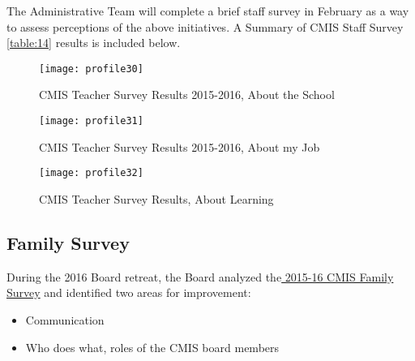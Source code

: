 The Administrative Team will complete a brief staff survey in February as a way to assess perceptions of the above initiatives.  A Summary of CMIS Staff Survey \ref{table:14} results is included below.   


\begin{figure}
\centering
\texttt{[image: profile30]}
\caption{CMIS Teacher Survey Results 2015-2016, About the School}
\end{figure}

\begin{figure}
\centering
\texttt{[image: profile31]}
\caption{CMIS Teacher Survey Results 2015-2016, About my Job}
\end{figure}

\begin{figure}
\centering
\texttt{[image: profile32]}
\caption{CMIS Teacher Survey Results, About Learning}
\end{figure}

\subsection{Family Survey}

During the 2016 Board retreat, the Board analyzed the\href{https://docs.google.com/a/cmis.ac.th/forms/d/16Gbd3MzQOXtjjZ2dG460xw5SHG_eohMIKet3lxYUdAY/edit#responses}{ 2015-16 CMIS Family Survey} and identified two areas for improvement:
\begin{itemize}
\item Communication
\item Who does what, roles of the CMIS board members
\end{itemize}


